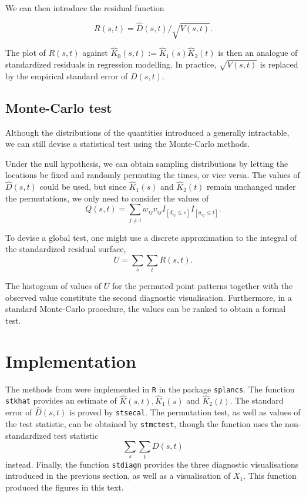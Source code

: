 \documentclass{article}
\begin{document}
We can then introduce the residual function

$$R(s,t) = \hat D(s,t)/ \sqrt{V(s,t)}.$$ 

The plot of $R(s,t)$ against $\hat K_0(s,t) := \hat K_1(s) \hat K_2(t)$ is then an analogue of standardized residuals in regression modelling. In practice, $\sqrt{V(s,t)}$ is replaced by the empirical standard error of $D(s,t)$.


\subsection{Monte-Carlo test}
Although the distributions of the quantities introduced a generally intractable, we can still devise a statistical test using the Monte-Carlo methods.

Under the null hypothesis, we can obtain sampling distributions by letting the locations be fixed and randomly permuting the times, or vice versa. The values of $\hat D(s,t)$ could be used, but since $\hat K_1(s)$ and $\hat K_2(t)$ remain unchanged under the permutations, we only need to consider the values of 
$$Q(s,t) = \sum_{j\neq i} w_{ij} v_{ij} I_{[d_{ij} \leq s]} I_{[u_{ij} \leq t]}.$$

To devise a global test, one might use a discrete approximation to the integral of the standardized residual surface,
$$U=\sum_s \sum_t R(s,t).$$ 

The histogram of values of $U$ for the permuted point patterns together with the observed value constitute the second diagnostic visualisation. Furthermore, in a standard Monte-Carlo procedure, the values can be ranked to obtain a formal test.






\section{Implementation}
The methods from \cite{diggle1995} were implemented in \texttt{R} in the package \texttt{splancs}. The function \texttt{stkhat} provides an estimate of $\hat K(s,t), \hat K_1(s)$ and $\hat K_2(t)$. The standard error of $\hat D(s,t)$ is proved by \texttt{stsecal}. The permutation test, as well as values of the test statistic, can be obtained by \texttt{stmctest}, though the function uses the non-standardized test statistic
$$\sum_s \sum_t D(s,t)$$
instead.
Finally, the function \texttt{stdiagn} provides the three diagnostic visualisations introduced in the previous section, as well as a visualisation of $X_1$. This function produced the figures in this text.
\end{document}
